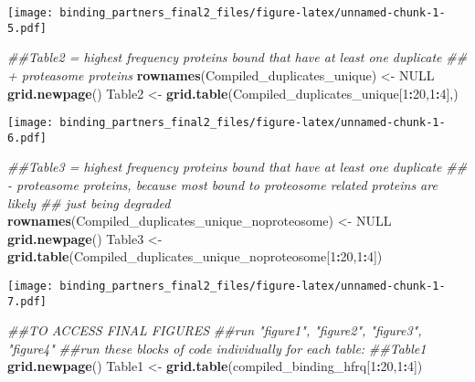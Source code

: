 \documentclass[]{article}
\newenvironment{Shaded}{\begin{snugshade}}{\end{snugshade}}
\newcommand{\CommentTok}[1]{\textcolor[rgb]{0.56,0.35,0.01}{\textit{#1}}}
\newcommand{\DecValTok}[1]{\textcolor[rgb]{0.00,0.00,0.81}{#1}}
\newcommand{\KeywordTok}[1]{\textcolor[rgb]{0.13,0.29,0.53}{\textbf{#1}}}
\newcommand{\NormalTok}[1]{#1}
\newcommand{\OperatorTok}[1]{\textcolor[rgb]{0.81,0.36,0.00}{\textbf{#1}}}
\newcommand{\OtherTok}[1]{\textcolor[rgb]{0.56,0.35,0.01}{#1}}
\newcommand{\StringTok}[1]{\textcolor[rgb]{0.31,0.60,0.02}{#1}}
\begin{document}
\texttt{[image: binding\_partners\_final2\_files/figure-latex/unnamed-chunk-1-5.pdf]}

\begin{Shaded}
\begin{Highlighting}[]
\CommentTok{##Table2 = highest frequency proteins bound that have at least one duplicate}
\CommentTok{## + proteasome proteins}
\KeywordTok{rownames}\NormalTok{(Compiled_duplicates_unique) <-}\StringTok{ }\OtherTok{NULL}
\KeywordTok{grid.newpage}\NormalTok{()}
\NormalTok{Table2 <-}\StringTok{ }\KeywordTok{grid.table}\NormalTok{(Compiled_duplicates_unique[}\DecValTok{1}\OperatorTok{:}\DecValTok{20}\NormalTok{,}\DecValTok{1}\OperatorTok{:}\DecValTok{4}\NormalTok{],)}
\end{Highlighting}
\end{Shaded}

\texttt{[image: binding\_partners\_final2\_files/figure-latex/unnamed-chunk-1-6.pdf]}

\begin{Shaded}
\begin{Highlighting}[]
\CommentTok{##Table3 = highest frequency proteins bound that have at least one duplicate }
\CommentTok{## - proteasome proteins, because most bound to proteosome related proteins are likely}
\CommentTok{## just being degraded}
\KeywordTok{rownames}\NormalTok{(Compiled_duplicates_unique_noproteosome) <-}\StringTok{ }\OtherTok{NULL}
\KeywordTok{grid.newpage}\NormalTok{()}
\NormalTok{Table3 <-}\StringTok{ }\KeywordTok{grid.table}\NormalTok{(Compiled_duplicates_unique_noproteosome[}\DecValTok{1}\OperatorTok{:}\DecValTok{20}\NormalTok{,}\DecValTok{1}\OperatorTok{:}\DecValTok{4}\NormalTok{])}
\end{Highlighting}
\end{Shaded}

\texttt{[image: binding\_partners\_final2\_files/figure-latex/unnamed-chunk-1-7.pdf]}

\begin{Shaded}
\begin{Highlighting}[]
\CommentTok{##TO ACCESS FINAL FIGURES}
\CommentTok{##run "figure1", "figure2", "figure3", "figure4"}
\CommentTok{##run these blocks of code individually for each table:}
\CommentTok{##Table1}
\KeywordTok{grid.newpage}\NormalTok{()}
\NormalTok{Table1 <-}\StringTok{ }\KeywordTok{grid.table}\NormalTok{(compiled_binding_hfrq[}\DecValTok{1}\OperatorTok{:}\DecValTok{20}\NormalTok{,}\DecValTok{1}\OperatorTok{:}\DecValTok{4}\NormalTok{])}
\end{Highlighting}
\end{Shaded}
\end{document}
